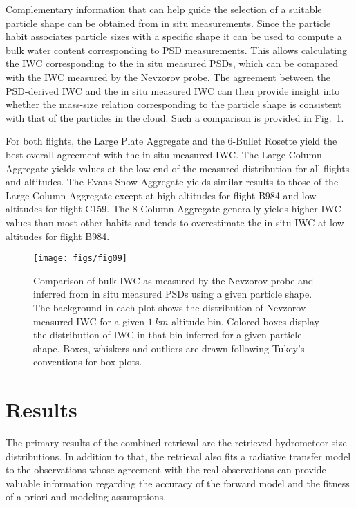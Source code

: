 \documentclass[journal abbreviation, manuscript]{copernicus}
\begin{document}
Complementary information that can help guide the selection of a suitable
particle shape can be obtained from in situ measurements. Since the particle
habit associates particle sizes with a specific shape it can be used to compute
a bulk water content corresponding to PSD measurements. This allows calculating
the IWC corresponding to the in situ measured PSDs, which can be compared with
the IWC measured by the Nevzorov probe. The agreement between the PSD-derived
IWC and the in situ measured IWC can then provide insight into whether the
mass-size relation corresponding to the particle shape is consistent with
that of the particles in the cloud. Such a comparison is provided in
Fig.~\ref{fig:mass_size_relation}.

For both flights, the Large Plate Aggregate and the 6-Bullet Rosette yield
the best overall agreement with the in situ measured IWC. The Large Column
Aggregate yields values at the low end of the measured distribution for all
flights and altitudes. The Evans Snow Aggregate yields similar results to those
of the Large Column Aggregate except at high altitudes for flight B984 and low
altitudes for flight C159. The 8-Column Aggregate generally yields higher IWC
values than most other habits and tends to overestimate the in situ IWC at low
altitudes for flight B984.

\begin{figure}
  \centering
  \texttt{[image: figs/fig09]}
  \caption{ Comparison of bulk IWC as measured by the Nevzorov probe and
    inferred from in situ measured PSDs using a given particle shape. The
    background in each plot shows the distribution of Nevzorov-measured IWC for
    a given $1\ \unit{km}$-altitude bin. Colored boxes display the distribution
    of IWC in that bin inferred for a given particle shape. Boxes, whiskers and
    outliers are drawn following Tukey's conventions for box plots.}
  \label{fig:mass_size_relation}
\end{figure}


\section{Results}
\label{sec:results}

The primary results of the combined retrieval are the retrieved hydrometeor size
distributions. In addition to that, the retrieval also fits a radiative transfer
model to the observations whose agreement with the real observations can provide
valuable information regarding the accuracy of the forward model and the fitness
of a priori and modeling assumptions.
\end{document}
